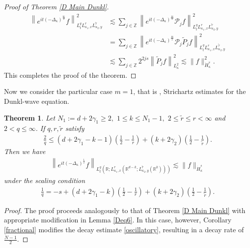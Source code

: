 \documentclass[a4paper,11pt, reqno]{amsart}
\newtheorem{theorem}{Theorem}[section]
\theoremstyle{definition}
\theoremstyle{remark}
\numberwithin{equation}{section}
\begin{document}
\begin{proof}[Proof of  Theorem \ref{D Main Dunkl}]
		$$
		\begin{aligned}
			\left\|e^{i t(-\Delta_\kappa)^{\frac{m}{2}}} f\right\|_{L_t^q L_{\kappa_1, x}^r L_{\kappa_2, y}^{\tilde{r}}}^2  
			& \lesssim \sum_{j \in \mathbb{Z}}\left\|e^{i t(-\Delta_\kappa)^{\frac{m}{2}}} \mathcal{P}_j  f\right\|_{L_t^q L_{\kappa_1, x}^r L_{\kappa_2, y}^{\tilde{r}}}^2 \\
			&= \sum_{j \in \mathbb{Z}}\left\|e^{i t(-\Delta_\kappa)^{\frac{m}{2}}} \mathcal{P}_j  \widetilde{P}_j f\right\|_{L_t^q L_{\kappa_1, x}^r L_{\kappa_2, y}^{\tilde{\tau}}}^2\\
			&   \lesssim \sum_{j \in \mathbb{Z}} 2^{2 j s}\left\|\widetilde{P}_j f\right\|_{L_{\kappa}^2}^2 \lesssim\|f\|_{\dot{H}_{\kappa}^s}^2. 
		\end{aligned}
		$$ This completes the proof of the theorem. 
\end{proof}
 Now we consider the particular case $m=1$, that is ,  Strichartz estimates for the Dunkl-wave equation. 
	\begin{theorem}\label{D Main Dunkl wave}
		Let $N_1:=d+2\gamma_1 \geq 2,$ $1 \leq k \leq N_1-1,$ $ 2 \leq \widetilde{r} \leq r<\infty $ and $ 2<q \leq \infty$. If $ q, r, \tilde{r}$ satisfy  
		\begin{align}\label{eq00W}
			\frac{2}{q} \leq(d+2\gamma_1-k-1)\left(\frac{1}{2}-\frac{1}{r}\right)+(k+2\gamma_2)\left(\frac{1}{2}-\frac{1}{\widetilde{r}}\right). 
		\end{align}
		Then we have
		\begin{align}\label{Deq11W}
			\left\|e^{i t(-\Delta_\kappa)^{\frac{1}{2}}} f\right\|_{L_t^q\left(\mathbb{R} ; L_{\kappa_1, x}^r\left(\mathbb{R}^{d-k} ; L_{\kappa_2,y}^{\tilde{r}}\left(\mathbb{R}^k\right)\right)\right)} \lesssim\|f\|_{\dot{H}_{\kappa}^s}
		\end{align}
		under the scaling condition
		\begin{align}\label{Deq2W}
			\frac{{{1}}}{q}=-s +(d+2\gamma_1-k)\left(\frac{1}{2}-\frac{1}{r}\right)+(k+2\gamma_2)\left(\frac{1}{2}-\frac{1}{\widetilde{r}}\right).
		\end{align}
	\end{theorem}   
	\begin{proof}
			The proof proceeds analogously to that of Theorem \ref{D Main Dunkl} with appropriate modification in Lemma \ref{Deq6}. In this case, however, Corollary \ref{fractional} modifies the decay estimate \eqref{oscillatory}, resulting in a decay rate of $\tfrac{N-1}{2}$.
	\end{proof}
	
\end{document}
